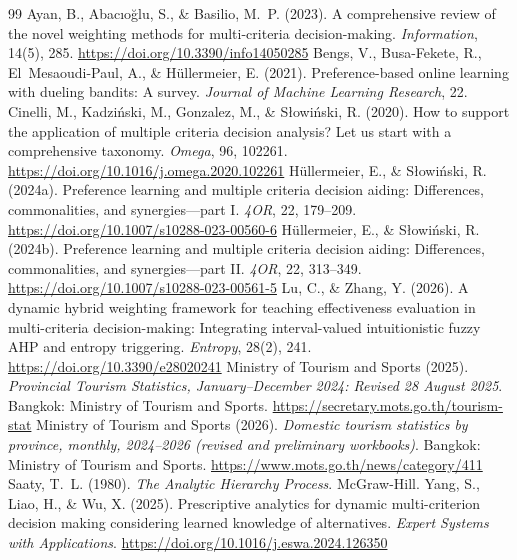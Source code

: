 \documentclass[12pt,a4paper]{article}
\begin{document}
\begin{thebibliography}{99}\small
{} Ayan, B., Abac{\i}o\u{g}lu, S., \& Basilio, M.~P. (2023). A comprehensive review of the novel weighting methods for multi-criteria decision-making. \emph{Information}, 14(5), 285. \url{https://doi.org/10.3390/info14050285}
 Bengs, V., Busa-Fekete, R., El~Mesaoudi-Paul, A., \& H\"ullermeier, E. (2021). Preference-based online learning with dueling bandits: A survey. \emph{Journal of Machine Learning Research}, 22.
 Cinelli, M., Kadzi\'nski, M., Gonzalez, M., \& S{\l}owi\'nski, R. (2020). How to support the application of multiple criteria decision analysis? Let us start with a comprehensive taxonomy. \emph{Omega}, 96, 102261. \url{https://doi.org/10.1016/j.omega.2020.102261}
 H\"ullermeier, E., \& S{\l}owi\'nski, R. (2024a). Preference learning and multiple criteria decision aiding: Differences, commonalities, and synergies---part I. \emph{4OR}, 22, 179--209. \url{https://doi.org/10.1007/s10288-023-00560-6}
 H\"ullermeier, E., \& S{\l}owi\'nski, R. (2024b). Preference learning and multiple criteria decision aiding: Differences, commonalities, and synergies---part II. \emph{4OR}, 22, 313--349. \url{https://doi.org/10.1007/s10288-023-00561-5}
 Lu, C., \& Zhang, Y. (2026). A dynamic hybrid weighting framework for teaching effectiveness evaluation in multi-criteria decision-making: Integrating interval-valued intuitionistic fuzzy AHP and entropy triggering. \emph{Entropy}, 28(2), 241. \url{https://doi.org/10.3390/e28020241}
 Ministry of Tourism and Sports (2025). \emph{Provincial Tourism Statistics, January--December 2024: Revised 28 August 2025}. Bangkok: Ministry of Tourism and Sports. \url{https://secretary.mots.go.th/tourism-stat}
 Ministry of Tourism and Sports (2026). \emph{Domestic tourism statistics by province, monthly, 2024--2026 (revised and preliminary workbooks)}. Bangkok: Ministry of Tourism and Sports. \url{https://www.mots.go.th/news/category/411}
 Saaty, T.~L. (1980). \emph{The Analytic Hierarchy Process}. McGraw-Hill.
 Yang, S., Liao, H., \& Wu, X. (2025). Prescriptive analytics for dynamic multi-criterion decision making considering learned knowledge of alternatives. \emph{Expert Systems with Applications}. \url{https://doi.org/10.1016/j.eswa.2024.126350}
\end{thebibliography}
\end{document}
